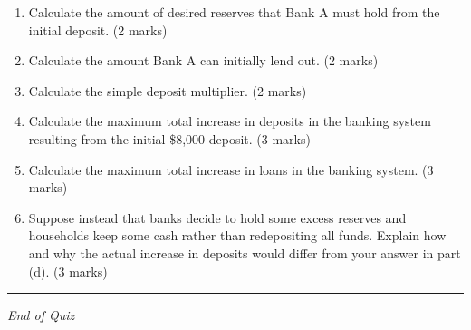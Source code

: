 \documentclass[12pt]{article}
\begin{document}
\begin{enumerate}
    \item[(a)] Calculate the amount of desired reserves that Bank A must hold from the initial deposit. (2 marks)
    \item[(b)] Calculate the amount Bank A can initially lend out. (2 marks)
    \item[(c)] Calculate the simple deposit multiplier. (2 marks)
    \item[(d)] Calculate the maximum total increase in deposits in the banking system resulting from the initial \$8{,}000 deposit. (3 marks)
    \item[(e)] Calculate the maximum total increase in loans in the banking system. (3 marks)
    \item[(f)] Suppose instead that banks decide to hold some excess reserves and households keep some cash rather than redepositing all funds. Explain how and why the actual increase in deposits would differ from your answer in part (d). (3 marks)
\end{enumerate}

\hrule
\vspace{1em}

\begin{center}
\textit{End of Quiz}
\end{center}
\end{document}
